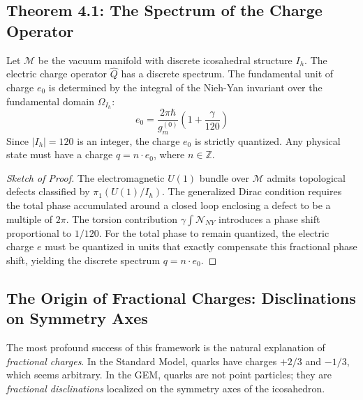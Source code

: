 \subsection{Theorem 4.1: The Spectrum of the Charge Operator}

\begin{theorem}
\label{thm:charge_quant}
Let $\mathcal{M}$ be the vacuum manifold with discrete icosahedral structure $I_h$. The electric charge operator $\hat{Q}$ has a discrete spectrum. The fundamental unit of charge $e_0$ is determined by the integral of the Nieh-Yan invariant over the fundamental domain $\Omega_{I_h}$:
\begin{equation}
    e_0 = \frac{2\pi \hbar}{g_m^{(0)}} \left( 1 + \frac{\gamma}{120} \right)
\end{equation}
Since $|I_h| = 120$ is an integer, the charge $e_0$ is strictly quantized. Any physical state must have a charge $q = n \cdot e_0$, where $n \in \mathbb{Z}$.
\end{theorem}

\begin{proof}[Sketch of Proof]
The electromagnetic $U(1)$ bundle over $\mathcal{M}$ admits topological defects classified by $\pi_1(U(1)/I_h)$. The generalized Dirac condition requires the total phase accumulated around a closed loop enclosing a defect to be a multiple of $2\pi$. The torsion contribution $\gamma \int \mathcal{N}_{NY}$ introduces a phase shift proportional to $1/120$. For the total phase to remain quantized, the electric charge $e$ must be quantized in units that exactly compensate this fractional phase shift, yielding the discrete spectrum $q = n \cdot e_0$.
\end{proof}

\subsection{The Origin of Fractional Charges: Disclinations on Symmetry Axes}

The most profound success of this framework is the natural explanation of \textit{fractional charges}. In the Standard Model, quarks have charges $+2/3$ and $-1/3$, which seems arbitrary. In the GEM, quarks are not point particles; they are \textit{fractional disclinations} localized on the symmetry axes of the icosahedron.

